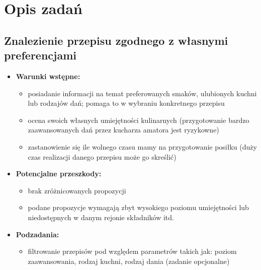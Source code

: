 \documentclass{article}
\begin{document}
\section{Opis zadań}
\subsection{Znalezienie przepisu zgodnego z własnymi preferencjami}
  \begin{itemize} \item \textbf{Warunki wstępne:}
      \begin{itemize}
        \item posiadanie informacji na temat preferowanych smaków, ulubionych kuchni lub rodzajów dań; pomaga to w wybraniu konkretnego przepisu
        \item ocena swoich własnych umiejętności kulinarnych (przygotowanie bardzo zaawansowanych dań przez kucharza amatora jest ryzykowne) 
        \item zastanowienie się ile wolnego czasu mamy na przygotowanie posiłku (duży czas realizacji danego przepisu może go skreślić)
      \end{itemize}
    \item \textbf{Potencjalne przeszkody:}
      \begin{itemize}
        \item brak zróżnicowanych propozycji
        \item podane propozycje wymagają zbyt wysokiego poziomu umiejętności lub niedostępnych w danym rejonie składników itd.
      \end{itemize}
    \item \textbf{Podzadania:}
      \begin{itemize}
        \item filtrowanie przepisów pod względem parametrów takich jak: poziom zaawansowania, rodzaj kuchni, rodzaj dania (zadanie opcjonalne)
      \end{itemize}
  \end{itemize}
\end{document}
